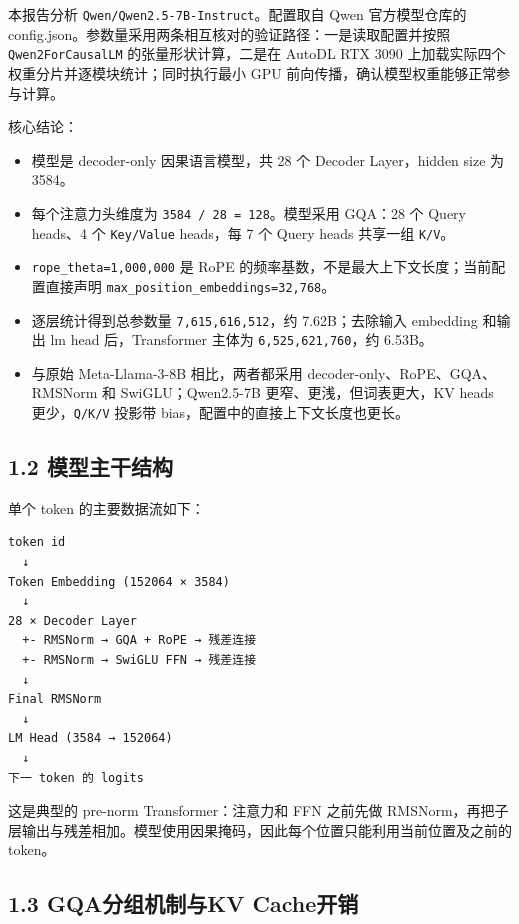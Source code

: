 \documentclass[UTF8,fontset=fandol,a4paper,11pt]{ctexart}
\providecommand{\tightlist}{\setlength{\itemsep}{0pt}\setlength{\parskip}{0pt}}
\begin{document}
本报告分析 \nolinkurl{Qwen/Qwen2.5-7B-Instruct}。配置取自 Qwen
官方模型仓库的
config.json。参数量采用两条相互核对的验证路径：一是读取配置并按照
\nolinkurl{Qwen2ForCausalLM} 的张量形状计算，二是在 AutoDL RTX 3090
上加载实际四个权重分片并逐模块统计；同时执行最小 GPU
前向传播，确认模型权重能够正常参与计算。

核心结论：

\begin{itemize}
\tightlist
\item
  模型是 decoder-only 因果语言模型，共 28 个 Decoder Layer，hidden size
  为 3584。
\item
  每个注意力头维度为 \nolinkurl{3584 / 28 = 128}。模型采用 GQA：28 个
  Query heads、4 个 {\nolinkurl{Key/Value}} heads，每 7 个 Query heads
  共享一组 {\nolinkurl{K/V}。}
\item
  \nolinkurl{rope_theta=1,000,000} 是 RoPE
  的频率基数，不是最大上下文长度；当前配置直接声明
  \nolinkurl{max_position_embeddings=32,768}。
\item
  逐层统计得到总参数量 \nolinkurl{7,615,616,512}，约 7.62B；去除输入
  embedding 和输出 lm head 后，Transformer 主体为
  \nolinkurl{6,525,621,760}，约 6.53B。
\item
  与原始 Meta-Llama-3-8B 相比，两者都采用
  decoder-only、RoPE、GQA、RMSNorm 和 SwiGLU；Qwen2.5-7B
  更窄、更浅，但词表更大，KV heads {更少，\nolinkurl{Q/K/V}} 投影带
  bias，配置中的直接上下文长度也更长。
\end{itemize}

\subsection{1.2 模型主干结构}\label{ux6a21ux578bux4e3bux5e72ux7ed3ux6784}

单个 token 的主要数据流如下：

\begin{Verbatim}[breaklines,breakanywhere,fontsize=\small]
token id
  ↓
Token Embedding (152064 × 3584)
  ↓
28 × Decoder Layer
  +- RMSNorm → GQA + RoPE → 残差连接
  +- RMSNorm → SwiGLU FFN → 残差连接
  ↓
Final RMSNorm
  ↓
LM Head (3584 → 152064)
  ↓
下一 token 的 logits
\end{Verbatim}

这是典型的 pre-norm Transformer：注意力和 FFN 之前先做
RMSNorm，再把子层输出与残差相加。模型使用因果掩码，因此每个位置只能利用当前位置及之前的
token。

\subsection{1.3 GQA分组机制与KV Cache开销}\label{gqaux5206ux7ec4ux673aux5236ux4e0ekv-cacheux5f00ux9500}
\end{document}
